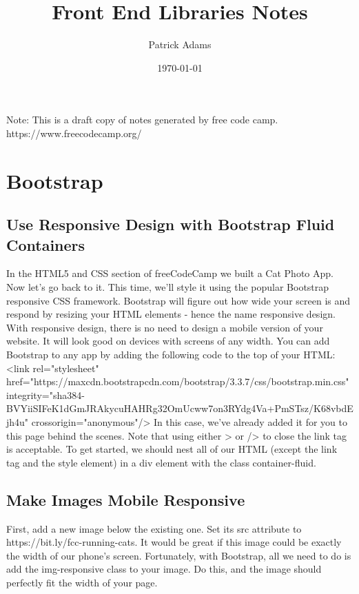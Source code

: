\documentclass{article}%
\title{Front End Libraries Notes}%
\author{Patrick Adams}%
\date{\today}%
\begin{document}
%
\normalsize%
\maketitle%
\newpage%
Note: This is a draft copy of notes generated by free code camp.\newline%
%
https://www.freecodecamp.org/%
\newpage%
\tableofcontents%
\section{Bootstrap}%
\label{sec:Bootstrap}%
\subsection{Use Responsive Design with Bootstrap Fluid Containers}%
\label{subsec:UseResponsiveDesignwithBootstrapFluidContainers}%
In the HTML5 and CSS section of freeCodeCamp we built a Cat Photo App. Now let's go back to it. This time, we'll style it using the popular Bootstrap responsive CSS framework.\newline%
Bootstrap will figure out how wide your screen is and respond by resizing your HTML elements {-} hence the name responsive design.\newline%
With responsive design, there is no need to design a mobile version of your website. It will look good on devices with screens of any width.\newline%
You can add Bootstrap to any app by adding the following code to the top of your HTML:\newline%
<link rel="stylesheet" href="https://maxcdn.bootstrapcdn.com/bootstrap/3.3.7/css/bootstrap.min.css" integrity="sha384{-}BVYiiSIFeK1dGmJRAkycuHAHRg32OmUcww7on3RYdg4Va+PmSTsz/K68vbdEjh4u" crossorigin="anonymous"/>\newline%
In this case, we've already added it for you to this page behind the scenes. Note that using either > or /> to close the link tag is acceptable.\newline%
To get started, we should nest all of our HTML (except the link tag and the style element) in a div element with the class container{-}fluid.\newline%

%
\subsection{Make Images Mobile Responsive}%
\label{subsec:MakeImagesMobileResponsive}%
First, add a new image below the existing one. Set its src attribute to https://bit.ly/fcc{-}running{-}cats.\newline%
It would be great if this image could be exactly the width of our phone's screen.\newline%
Fortunately, with Bootstrap, all we need to do is add the img{-}responsive class to your image. Do this, and the image should perfectly fit the width of your page.\newline%
\end{document}
